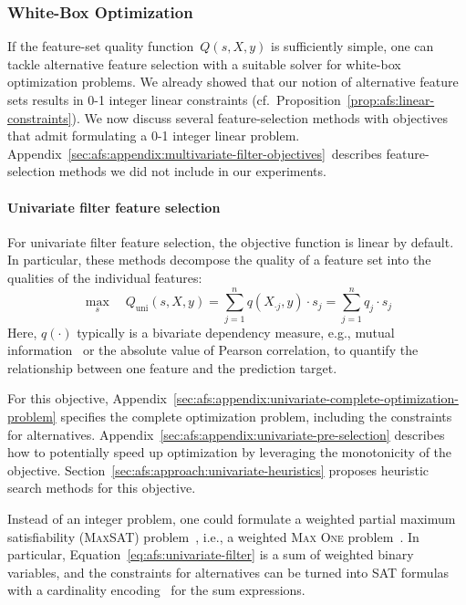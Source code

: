 \documentclass{article}
\theoremstyle{definition}
\begin{document}
\subsubsection{White-Box Optimization}
\label{sec:afs:approach:objectives:white-box}

If the feature-set quality function~$Q(s,X,y)$ is sufficiently simple, one can tackle alternative feature selection with a suitable solver for white-box optimization problems.
We already showed that our notion of alternative feature sets results in 0-1 integer linear constraints (cf.~Proposition~\ref{prop:afs:linear-constraints}).
We now discuss several feature-selection methods with objectives that admit formulating a 0-1 integer linear problem.
Appendix~\ref{sec:afs:appendix:multivariate-filter-objectives}~describes feature-selection methods we did not include in our experiments.

\paragraph{Univariate filter feature selection}

For univariate filter feature selection, the objective function is linear by default.
In particular, these methods decompose the quality of a feature set into the qualities of the individual features:
%
\begin{equation}
	\max_s \quad Q_{\text{uni}}(s,X,y) = \sum_{j=1}^{n} q(X_{\cdot{}j},y) \cdot s_j = \sum_{j=1}^{n} q_j \cdot s_j
	\label{eq:afs:univariate-filter}
\end{equation}
%
Here, $q(\cdot)$ typically is a bivariate dependency measure, e.g., mutual information~\cite{kraskov2004estimating} or the absolute value of Pearson correlation, to quantify the relationship between one feature and the prediction target.

For this objective, Appendix~\ref{sec:afs:appendix:univariate-complete-optimization-problem} specifies the complete optimization problem, including the constraints for alternatives.
Appendix~\ref{sec:afs:appendix:univariate-pre-selection} describes how to potentially speed up optimization by leveraging the monotonicity of the objective.
Section~\ref{sec:afs:approach:univariate-heuristics} proposes heuristic search methods for this objective.

Instead of an integer problem, one could formulate a weighted partial maximum satisfiability (\textsc{MaxSAT}) problem~\cite{bacchus2021maximum, li2021maxsat}, i.e., a weighted \textsc{Max One} problem~\cite{khanna1997complete}.
In particular, Equation~\ref{eq:afs:univariate-filter} is a sum of weighted binary variables, and the constraints for alternatives can be turned into SAT formulas with a cardinality encoding~\cite{sinz2005towards} for the sum expressions.
\end{document}
